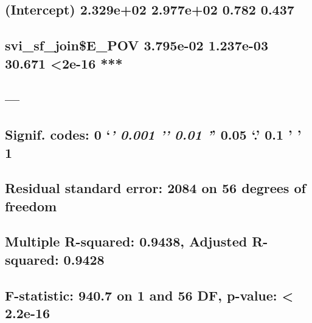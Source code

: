 \documentclass[
  12pt,
]{article}
\begin{document}
\hypertarget{intercept-2.329e02-2.977e02-0.782-0.437}{%
\subsection{(Intercept) 2.329e+02 2.977e+02 0.782
0.437}\label{intercept-2.329e02-2.977e02-0.782-0.437}}

\hypertarget{svi_sf_joine_pov-3.795e-02-1.237e-03-30.671-2e-16}{%
\subsection{svi\_sf\_join\$E\_POV 3.795e-02 1.237e-03 30.671
\textless2e-16
***}\label{svi_sf_joine_pov-3.795e-02-1.237e-03-30.671-2e-16}}

\hypertarget{section-78}{%
\subsection{---}\label{section-78}}

\hypertarget{signif.-codes-0-0.001-0.01-0.05-.-0.1-1-7}{%
\subsection{\texorpdfstring{Signif. codes: 0 `\emph{\textbf{' 0.001 '}'
0.01 '}' 0.05 `.' 0.1 ' '
1}{Signif. codes: 0 `\,' 0.001 '\,' 0.01 '\,' 0.05 `.' 0.1 ' ' 1}}\label{signif.-codes-0-0.001-0.01-0.05-.-0.1-1-7}}

\hypertarget{section-79}{%
\subsection{}\label{section-79}}

\hypertarget{residual-standard-error-2084-on-56-degrees-of-freedom}{%
\subsection{Residual standard error: 2084 on 56 degrees of
freedom}\label{residual-standard-error-2084-on-56-degrees-of-freedom}}

\hypertarget{multiple-r-squared-0.9438-adjusted-r-squared-0.9428}{%
\subsection{Multiple R-squared: 0.9438, Adjusted R-squared:
0.9428}\label{multiple-r-squared-0.9438-adjusted-r-squared-0.9428}}

\hypertarget{f-statistic-940.7-on-1-and-56-df-p-value-2.2e-16}{%
\subsection{F-statistic: 940.7 on 1 and 56 DF, p-value: \textless{}
2.2e-16}\label{f-statistic-940.7-on-1-and-56-df-p-value-2.2e-16}}
\end{document}
